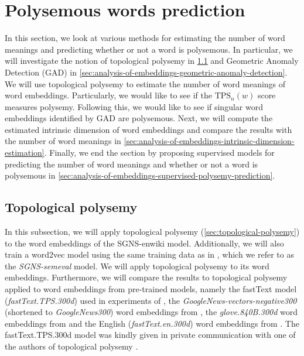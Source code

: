 \section{Polysemous words prediction}
\label{sec:polysemous-words-prediction}
In this section, we look at various methods for estimating the number of word meanings and predicting whether or not a word is polysemous. In particular, we will investigate the notion of topological polysemy in \cref{sec:analysis-of-embeddings-topological-polysemy} and Geometric Anomaly Detection (GAD) in \cref{sec:analysis-of-embeddings-geometric-anomaly-detection}. We will use topological polysemy to estimate the number of word meanings of word embeddings. Particularly, we would like to see if the $\text{TPS}_n(w)$ score measures polysemy. Following this, we would like to see if singular word embeddings identified by GAD are polysemous. Next, we will compute the estimated intrinsic dimension of word embeddings and compare the results with the number of word meanings in \cref{sec:analysis-of-embeddings-intrinsic-dimension-estimation}. Finally, we end the section by proposing supervised models for predicting the number of word meanings and whether or not a word is polysemous in \cref{sec:analysis-of-embeddings-supervised-polysemy-prediction}.

\subsection{Topological polysemy}
\label{sec:analysis-of-embeddings-topological-polysemy}
In this subsection, we will apply topological polysemy (\cref{sec:topological-polysemy}) to the word embeddings of the SGNS-enwiki model. Additionally, we will also train a word2vec model using the same training data as in \cite{jakubowski2020topology}, which we refer to as the \textit{SGNS-semeval} model. We will apply topological polysemy to its word embeddings. Furthermore, we will compare the results to topological polysemy applied to word embeddings from pre-trained models, namely the fastText model (\textit{fastText.TPS.300d}) used in experiments of \cite{jakubowski2020topology}, the \textit{GoogleNews-vectors-negative300} (shortened to \textit{GoogleNews300}) word embeddings from \cite{GoogleCodeArchiveWord2vec}, the \textit{glove.840B.300d} word embeddings from \cite{GloVeProject2014} and the English (\textit{fastText.en.300d}) word embeddings from \cite{grave2018learning}. The fastText.TPS.300d model was kindly given in private communication with one of the authors of topological polysemy \cite{ZibrowiusPrivComs2021}.

